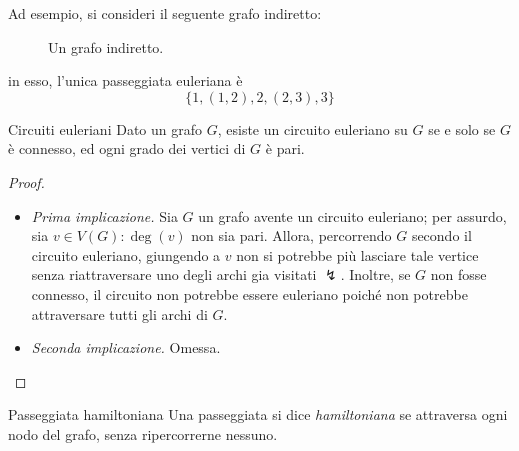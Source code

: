 \documentclass[a4paper, 12pt]{report}
\begin{document}
    \begin{example}
        Ad esempio, si consideri il seguente grafo indiretto:

        \begin{figure}[H]
            \centering
            \caption{Un grafo indiretto.}
        \end{figure}

        in esso, l'unica passeggiata euleriana è $$\{1, (1,2), 2, (2,3), 3\}$$
    \end{example}

    \begin{framedthm}{Circuiti euleriani}
        Dato un grafo $G$, esiste un circuito euleriano su $G$ se e solo se $G$ è connesso, ed ogni grado dei vertici di $G$ è pari.
    \end{framedthm}

    \begin{proof}
        \hspace{0.7cm}
        \begin{itemize}
            \item[] \textit{Prima implicazione.} Sia $G$ un grafo avente un circuito euleriano; per assurdo, sia $v \in V(G) : \deg(v)$ non sia pari. Allora, percorrendo $G$ secondo il circuito euleriano, giungendo a $v$ non si potrebbe più lasciare tale vertice senza riattraversare uno degli archi gia visitati $\lightning$. Inoltre, se $G$ non fosse connesso, il circuito non potrebbe essere euleriano poiché non potrebbe attraversare tutti gli archi di $G$.
            \item[] \textit{Seconda implicazione.} Omessa.
        \end{itemize}
    \end{proof}

    \begin{frameddefn}{Passeggiata hamiltoniana}
        Una passeggiata si dice \textit{hamiltoniana} se attraversa ogni nodo del grafo, senza ripercorrerne nessuno.
    \end{frameddefn}
\end{document}
